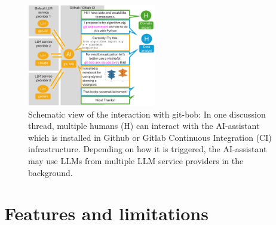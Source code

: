 \documentclass[times, twoside]{zHenriquesLab-StyleBioRxiv}
\begin{document}

\begin{figure}[h]
\centering
\includegraphics[width=0.5\textwidth]{example_interaction.png}
\caption{Schematic view of the interaction with git-bob: In one discussion thread, multiple humans (H) can interact with the AI-assistant which is installed in Github or Gitlab Continuous Integration (CI) infrastructure. Depending on how it is triggered, the AI-assistant may use LLMs from multiple LLM service providers in the background.
\newline
\newline
}
\label{fig:example_interaction}
\end{figure}

\section*{Features and limitations} 
\end{document}
